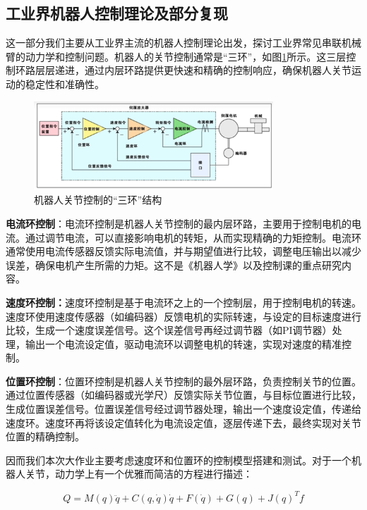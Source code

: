 \subsection{工业界机器人控制理论及部分复现}

这一部分我们主要从工业界主流的机器人控制理论出发，探讨工业界常见串联机械臂的动力学和控制问题。机器人的关节控制通常是“三环”，如图\ref{fig:32}所示。这三层控制环路层层递进，通过内层环路提供更快速和精确的控制响应，确保机器人关节运动的稳定性和准确性。

\begin{figure}[htbp]
    \centering
    \includegraphics[width=0.8\textwidth]{Image/fig38.png}
    \caption{机器人关节控制的“三环”结构}
    \label{fig:32}
\end{figure}

\textbf{电流环控制}：电流环控制是机器人关节控制的最内层环路，主要用于控制电机的电流。通过调节电流，可以直接影响电机的转矩，从而实现精确的力矩控制。电流环通常使用电流传感器反馈实际电流值，并与期望值进行比较，调整电压输出以减少误差，确保电机产生所需的力矩。这不是《机器人学》以及控制课的重点研究内容。

\textbf{速度环控制：}速度环控制是基于电流环之上的一个控制层，用于控制电机的转速。速度环使用速度传感器（如编码器）反馈电机的实际转速，与设定的目标速度进行比较，生成一个速度误差信号。这个误差信号再经过调节器（如PI调节器）处理，输出一个电流设定值，驱动电流环以调整电机的转速，实现对速度的精准控制。

\textbf{位置环控制}：位置环控制是机器人关节控制的最外层环路，负责控制关节的位置。通过位置传感器（如编码器或光学尺）反馈实际关节位置，与目标位置进行比较，生成位置误差信号。位置误差信号经过调节器处理，输出一个速度设定值，传递给速度环。速度环再将该设定值转化为电流设定值，逐层传递下去，最终实现对关节位置的精确控制。

因而我们本次大作业主要考虑速度环和位置环的控制模型搭建和测试。对于一个机器人关节，动力学上有一个优雅而简洁的方程进行描述：

\begin{equation}
    Q=M\left( q \right) \ddot{q}+C\left( q,\dot{q} \right) \dot{q}+F\left( \dot{q} \right) +G\left( q \right) +J\left( q \right) ^Tf
\end{equation}

